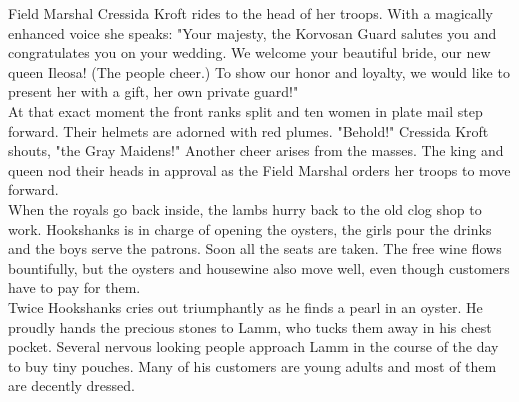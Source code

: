 Field Marshal Cressida Kroft rides to the head of her troops. With a magically enhanced voice she speaks: "Your majesty, the Korvosan Guard salutes you and congratulates you on your wedding. We welcome your beautiful bride, our new queen Ileosa! (The people cheer.) To show our honor and loyalty, we would like to present her with a gift, her own private guard!"\\

At that exact moment the front ranks split and ten women in plate mail step forward. Their helmets are adorned with red plumes. "Behold!" Cressida Kroft shouts, "the Gray Maidens!" Another cheer arises from the masses. The king and queen nod their heads in approval as the Field Marshal orders her troops to move forward.\\

When the royals go back inside, the lambs hurry back to the old clog shop to work. Hookshanks is in charge of opening the oysters, the girls pour the drinks and the boys serve the patrons. Soon all the seats are taken. The free wine flows bountifully, but the oysters and housewine also move well, even though customers have to pay for them.\\

Twice Hookshanks cries out triumphantly as he finds a pearl in an oyster. He proudly hands the precious stones to Lamm, who tucks them away in his chest pocket. Several nervous looking people approach Lamm in the course of the day to buy tiny pouches. Many of his customers are young adults and most of them are decently dressed.\\

